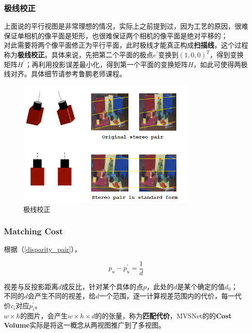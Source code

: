 		\subsubsection*{极线校正}
			上面说的平行视图是非常理想的情况，实际上之前提到过，因为工艺的原因，很难保证单相机的像平面是矩形，也很难保证两个相机的像平面是绝对平移的；\\

			对此需要将两个像平面修正为平行平面，此时极线才能真正构成\textbf{扫描线}，这个过程称为\textbf{极线校正}。具体来说，先把第二个平面的极点$e^\prime$变换到$(1,0,0)^T$，得到变换矩阵$H^\prime$；再利用投影误差最小化，得到第一个平面的变换矩阵$H$，如此可使得两极线对齐。具体细节请参考鲁鹏老师课程。
			\begin{figure}[H]
				\begin{center}
					\includegraphics[width=0.8\textwidth]{../images/epipolar.png}
				\end{center}
				\caption{极线校正}
			\end{figure}

		\subsubsection*{Matching Cost}
			根据（\ref{disparity_pair}），

			$$
				p_u - p^\prime_u = \frac{1}{d}
			$$

			视差与反投影距离$d$成反比，针对某个具体的点$p$，此处的$d$是某个确定的值$d_0$；\\

			不同的$d$会产生不同的视差，给$d$一个范围，逐一计算视差范围内的代价，每一代价$c_i$对应$p_i^\prime$。\\

			$w\times h$的图片，会产生$w\times h\times d$的的张量，称为\textbf{匹配代价}，MVSNet的的\textbf{Cost Volume}实际是将这一概念从两视图推广到了多视图。\\

